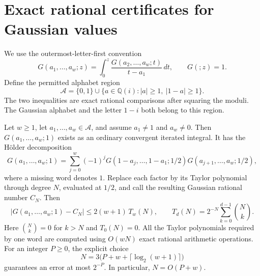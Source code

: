 \section{Exact rational certificates for Gaussian values}\label{sec:certificates}

We use the outermost-letter-first convention
\[
 G(a_1,\ldots,a_w;z)=\int_0^z
       \frac{G(a_2,\ldots,a_w;t)}{t-a_1}\,dt,
 \qquad G(;z)=1.
\]
Define the permitted alphabet region
\[
 \mathcal A=\{0,1\}\cup
 \{a\in\mathbb Q(i): |a|\geq1,\ |1-a|\geq1\}.
\]
The two inequalities are exact rational comparisons after squaring the
moduli. The Gaussian alphabet and the letter $1-i$ both belong to this
region.

\begin{theorem}\label{thm:certificate}
Let $w\geq1$, let $a_1,\ldots,a_w\in\mathcal A$, and assume
$a_1\ne1$ and $a_w\ne0$. Then $G(a_1,\ldots,a_w;1)$ exists as an ordinary
convergent iterated integral. It has the Hölder decomposition
\begin{equation}\label{audit:eq:holder}
 G(a_1,\ldots,a_w;1)
 =\sum_{j=0}^w(-1)^j
  G(1-a_j,\ldots,1-a_1;1/2)
  G(a_{j+1},\ldots,a_w;1/2),
\end{equation}
where a missing word denotes $1$.
Replace each factor by its Taylor polynomial through degree $N$, evaluated
at $1/2$, and call the resulting Gaussian rational number $C_N$. Then
\begin{equation}\label{audit:eq:radius}
 |G(a_1,\ldots,a_w;1)-C_N|
 \leq 2(w+1)\,T_w(N),\qquad
 T_d(N)=2^{-N}\sum_{k=0}^{d-1}\binom Nk.
\end{equation}
Here $\binom Nk=0$ for $k>N$ and $T_0(N)=0$.
All the Taylor polynomials required by one word are computed using
$O(wN)$ exact rational arithmetic operations.
For an integer $P\geq0$, the explicit choice
\begin{equation}\label{audit:eq:Nchoice}
 N=3\bigl(P+w+\lceil\log_2(w+1)\rceil\bigr)
\end{equation}
guarantees an error at most $2^{-P}$. In particular, $N=O(P+w)$.
\end{theorem}

